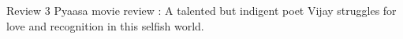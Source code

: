 Review 3
Pyaasa movie review :
A talented but indigent poet Vijay struggles for love and recognition in this selfish world.


